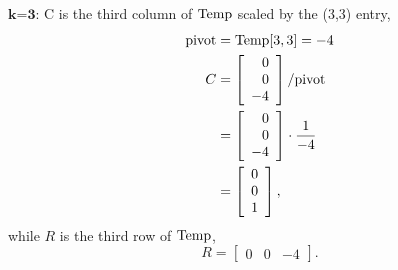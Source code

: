 $\textbf{k=3:}$ C is the third column of ${\rm Temp}$ scaled by the (3,3) entry,
\begin{align*}
    \textrm{pivot} &= {\rm Temp[3,3]} = -4 \\
    C &= \left[ \begin{array}{r} 0 \\ 0 \\ -4 \end{array} \right] \slash\textrm{pivot} \\
    &= \left[ \begin{array}{r} 0 \\ 0 \\ -4 \end{array} \right] \cdot \frac{1}{-4} \\ 
    &= \left[ \begin{array}{r} 0 \\ 0 \\ 1 \end{array} \right],
\end{align*}
while $R$ is the third row of $\rm Temp$,
$$ R = \left[ \begin{array}{rrr} 0 & 0 & -4 \end{array} \right]. $$

